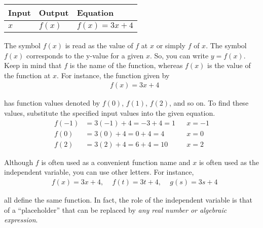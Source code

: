 \documentclass[11pt,fleqn,openany]{book} %
\begin{document}
\begin{table}[h]
    \centering
    \begin{tabular}{l l l}
    \toprule
    \textbf{Input} & \textbf{Output} & \textbf{Equation}\\
    \midrule
    $x$ & $f(x)$ & $f(x) = 3x+4$\\
    \bottomrule
    \end{tabular}
    \end{table}

    The symbol $f(x)$ is read as the value of $f$ at $x$ or simply 
    $f$ of $x$. The symbol $f(x)$ corresponds to the y-value for a 
    given $x$. So, you can write $y=f(x)$. Keep in mind that $f$ is 
    the name of the function, whereas $f(x)$ is the value of the 
    function at $x$. For instance, the function given by
    \begin{align}
        &  f(x) = 3x+4
        \end{align}

    has function values denoted by $f(0)$, $f(1)$, $f(2)$, and so on. 
    To find these values, substitute the specified input values into 
    the given equation.
    \begin{align*}
        f(-1)&=3(-1)+4 = -3+4 = 1    &&x=-1 \\
        f(0)&=3(0)+4 = 0+4 = 4       &&x=0 \\
        f(2)&=3(2)+4 = 6+4 = 10      &&x=2
      \end{align*}

    Although $f$ is often used as a convenient function name and $x$ 
    is often used as the independent variable, you can use other 
    letters. For instance,
    \begin{align}
        &  f(x) = 3x+4 \text{, }\quad f(t) = 3t+4 \text{, }\quad g(s) = 3s+4
        \end{align}

    all define the same function. In fact, the role of the independent 
    variable is that of a “placeholder” that can be replaced by \textit{any 
    real number or algebraic expression}.
\end{document}

